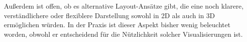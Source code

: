 Außerdem ist offen, ob es alternative Layout-Ansätze gibt, die eine noch klarere, verständlichere oder flexiblere Darstellung sowohl in 2D als auch in 3D ermöglichen würden. In der Praxis ist dieser Aspekt bisher wenig beleuchtet worden, obwohl er entscheidend für die Nützlichkeit solcher Visualisierungen ist.








